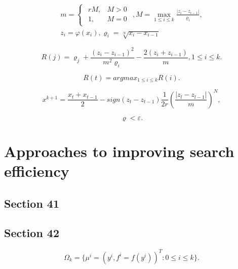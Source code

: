 \documentclass[runningheads]{llncs}
\begin{document}
\begin{equation}
    \label{eq:10}
		\begin{matrix}
		m=\begin{cases}
				\begin{matrix}
					 r M, & M >0 \\
					 1, & M = 0 
				\end{matrix} 
			\end{cases} ,
		M = \max_{1 \leq i \leq k} \frac{| z_i - z_{i-1}|}{\varrho_i}, \\
		z_i = \varphi( x_i ), \varrho_i=\sqrt[N]{x_i-x_{i-1}}
		\end{matrix}
\end{equation}

\begin{equation}
    \label{eq:11}
    R(j) = \varrho_j + \frac{(z_i-z_{i-1})^2}{m^2 \varrho_i} - \frac{2 (z_i+z_{i-1})}{m}, 1 \leq i \leq k.
\end{equation}


\begin{equation}
    \label{eq:12}
    R(t) = argmax_{1 \leq i \leq k} {R(i)}.
\end{equation}


\begin{equation}
    \label{eq:13}
    x^{k+1} = \frac{x_t + x_{t-1}}{2} - sign(z_t - z_{t-1}) \frac{1}{2r} \left(\frac{|z_l - z_{l-1}|}{m} \right)^N,
\end{equation}


\begin{equation}
    \label{eq:14}
    \varrho < \varepsilon.
\end{equation}



\section{Approaches to improving search efficiency}
\label{sec:4}

\subsection{Section 41}
\label{ssec:41}

\subsection{Section 42}
\label{ssec:42}

\begin{equation}
    \label{eq:15}
    \Omega_k=\{\mu^i = (y^i,f^i=f(y^i))^T: 0 \leq i \leq k\}.
\end{equation}
\end{document}
